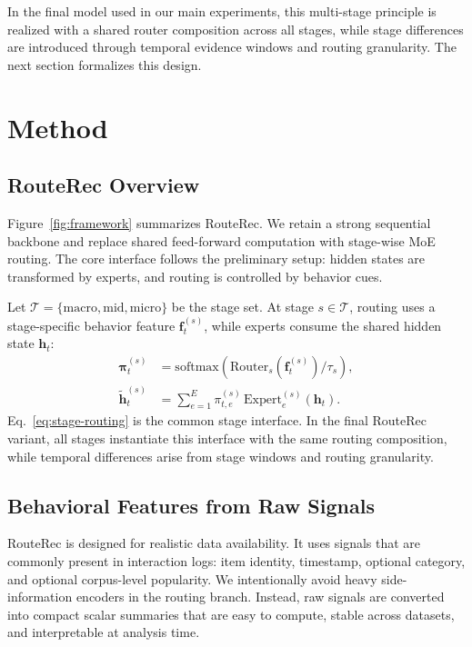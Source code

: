 \documentclass[sigconf,review,anonymous]{acmart}
\begin{document}
In the final model used in our main experiments, this multi-stage principle is realized with a shared router composition across all stages, while stage differences are introduced through temporal evidence windows and routing granularity. The next section formalizes this design.

\section{Method}
\label{sec:method}

\subsection{RouteRec Overview}
\label{sec:problem-framework}

Figure~\ref{fig:framework} summarizes RouteRec. We retain a strong sequential backbone and replace shared feed-forward computation with stage-wise MoE routing. The core interface follows the preliminary setup: hidden states are transformed by experts, and routing is controlled by behavior cues.

Let $\mathcal{T}=\{\mathrm{macro},\mathrm{mid},\mathrm{micro}\}$ be the stage set. At stage $s \in \mathcal{T}$, routing uses a stage-specific behavior feature $\mathbf{f}^{(s)}_t$, while experts consume the shared hidden state $\mathbf{h}_t$:
\begin{align}
\boldsymbol{\pi}^{(s)}_t
&=
\mathrm{softmax}\!\left(\mathrm{Router}_s(\mathbf{f}^{(s)}_t)/\tau_s\right), \\
\tilde{\mathbf{h}}^{(s)}_t
&=
\sum_{e=1}^{E}\pi^{(s)}_{t,e}\,\mathrm{Expert}^{(s)}_e(\mathbf{h}_t).
\label{eq:stage-routing}
\end{align}
Eq.~\eqref{eq:stage-routing} is the common stage interface. In the final RouteRec variant, all stages instantiate this interface with the same routing composition, while temporal differences arise from stage windows and routing granularity.

\subsection{Behavioral Features from Raw Signals}
\label{sec:feature-construction}

RouteRec is designed for realistic data availability. It uses signals that are commonly present in interaction logs: item identity, timestamp, optional category, and optional corpus-level popularity. We intentionally avoid heavy side-information encoders in the routing branch. Instead, raw signals are converted into compact scalar summaries that are easy to compute, stable across datasets, and interpretable at analysis time.
\end{document}
